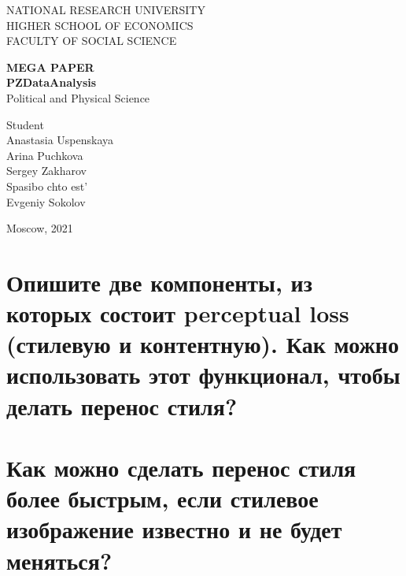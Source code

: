 \documentclass[14pt]{extarticle}
\begin{document}
	
	
	\thispagestyle{empty} 
	
	\begin{center}
		NATIONAL RESEARCH UNIVERSITY
		\\
		HIGHER SCHOOL OF ECONOMICS
		\\
		FACULTY OF SOCIAL SCIENCE
		
	\end{center}
	\vspace{12ex}
	
	\begin{center}
		\textbf{MEGA PAPER}\\
		\vspace{2ex}
		\textbf{PZDataAnalysis}\\
		\vspace{2ex}
		Political and Physical Science
	\end{center}
	
	\vspace{5ex}
	\begin{flushright}
		\hspace{40ex}
		Student\\
		Anastasia Uspenskaya \\
		Arina Puchkova \\
		Sergey Zakharov\\
		
		\vspace{5ex}
		Spasibo chto est'\\
		Evgeniy Sokolov \\
		
		
		
	\end{flushright}
	
	\begin{center}
		\vfill
		Moscow, 2021
	\end{center}
	
	\newpage
	
	
	\tableofcontents
	
	\newpage
	
	
	\section{Опишите две компоненты, из которых состоит perceptual loss (стилевую и контентную). Как можно использовать этот функционал, чтобы делать перенос стиля?}
	
	
	\newpage
	\section{Как можно сделать перенос стиля более быстрым, если стилевое изображение известно и не будет меняться?} %
	
	
\end{document}
